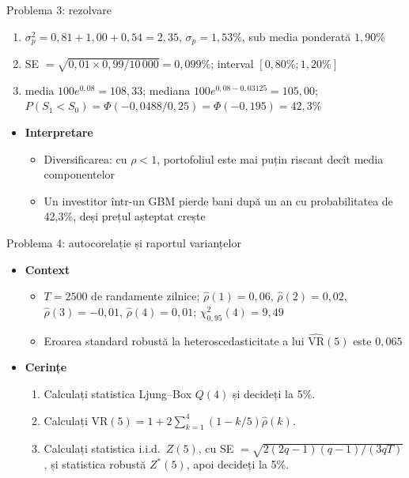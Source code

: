 \begin{frame}{Problema 3: rezolvare}
\itemsize{\footnotesize}
\begin{enumerate}
    \item $\sigma_p^2 = 0{,}81 + 1{,}00 + 0{,}54 = 2{,}35$, $\sigma_p = 1{,}53\%$, sub media ponderată $1{,}90\%$
    \item SE $= \sqrt{0{,}01 \times 0{,}99/10\,000} = 0{,}099\%$; interval $[0{,}80\%; 1{,}20\%]$
    \item media $100e^{0{,}08} = 108{,}33$; mediana $100e^{0{,}08 - 0{,}03125} = 105{,}00$; $P(S_1 < S_0) = \Phi(-0{,}0488/0{,}25) = \Phi(-0{,}195) = 42{,}3\%$
\end{enumerate}
\begin{itemize}
    \item \textbf{Interpretare}
    \begin{itemize}
        \item Diversificarea: cu $\rho < 1$, portofoliul este mai puțin riscant decît media componentelor
        \item Un investitor într-un GBM pierde bani după un an cu probabilitatea de 42{,}3\%, deși prețul așteptat crește
    \end{itemize}
\end{itemize}
\end{frame}

\begin{frame}{Problema 4: autocorelație și raportul varianțelor}
\itemsize{\footnotesize}
\begin{itemize}
    \item \textbf{Context}
    \begin{itemize}
        \item $T = 2500$ de randamente zilnice; $\hat\rho(1) = 0{,}06$, $\hat\rho(2) = 0{,}02$, $\hat\rho(3) = -0{,}01$, $\hat\rho(4) = 0{,}01$; $\chi^2_{0,95}(4) = 9{,}49$
        \item Eroarea standard robustă la heteroscedasticitate a lui $\widehat{\mathrm{VR}}(5)$ este $0{,}065$
    \end{itemize}
    \item \textbf{Cerințe}
\begin{enumerate}
    \item Calculați statistica Ljung--Box $Q(4)$ și decideți la 5\%.
    \item Calculați $\mathrm{VR}(5) = 1 + 2\sum_{k=1}^{4}(1 - k/5)\hat\rho(k)$.
    \item Calculați statistica i.i.d.\ $Z(5)$, cu SE $= \sqrt{2(2q-1)(q-1)/(3qT)}$, și statistica robustă $Z^*(5)$, apoi decideți la 5\%.
\end{enumerate}
\end{itemize}
\end{frame}

